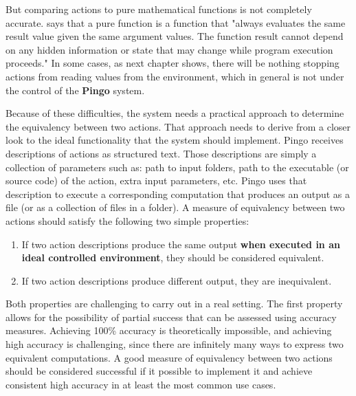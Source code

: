 But comparing actions to pure mathematical functions is not completely accurate.  \cite{wiki:purefunction} says that a pure function is a function that "always evaluates the same result value given the same argument values.  The function result cannot depend on any hidden information or state that may change while program execution proceeds." In some cases, as next chapter shows, there will be nothing stopping actions from reading values from the environment, which in general is not under the control of the \textbf{Pingo} system.

Because of these difficulties, the system needs a practical approach to determine the equivalency between two actions.  That approach needs to derive from a closer look to the ideal functionality that the system should implement.  Pingo receives descriptions of actions as structured text.  Those descriptions are simply a collection of parameters such as: path to input folders, path to the executable (or source code) of the action, extra input parameters, etc. Pingo uses that description to execute a corresponding computation that produces an output as a file (or as a collection of files in a folder). A measure of equivalency between two actions should satisfy the following two simple properties:

\begin{enumerate}
\item If two action descriptions produce the same output \textbf{when executed in an ideal controlled environment}, they should be considered equivalent.
\item If two action descriptions produce different output, they are inequivalent.
\end{enumerate}

Both properties are challenging to carry out in a real setting. The first property allows for the possibility of partial success that can be assessed using accuracy measures.  Achieving 100\% accuracy is theoretically impossible, and achieving high accuracy is challenging, since there are infinitely many ways to express two equivalent computations.  A good measure of equivalency between two actions should be considered successful if it possible to implement it and achieve consistent high accuracy in at least the most common use cases.

